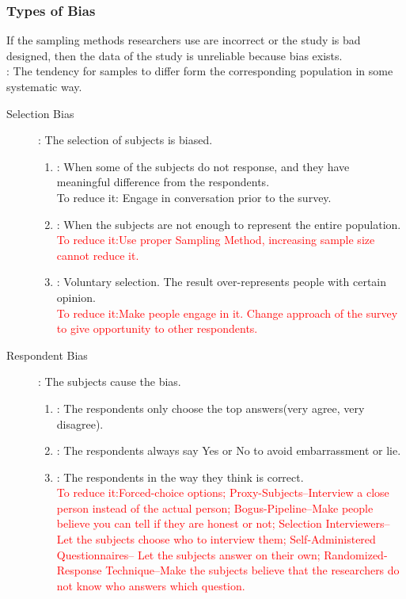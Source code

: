  
 \subsubsection{Types of Bias}
 If the sampling methods researchers use are incorrect or the study is bad designed, then the data of the study is unreliable because bias exists.\\
 
 
: The tendency for samples to differ form the corresponding population in some systematic way.
    \begin{description}
       \item[Selection Bias]: The selection of subjects is biased. 
       \begin{enumerate}
           \item {}: When some of the subjects do not response, and they have meaningful difference from the respondents.\\To reduce it: Engage in conversation prior to the survey.
            \item {} : When the subjects are not enough to represent the entire population.\\ \textcolor{red}{To reduce it:Use proper Sampling Method, increasing sample size cannot reduce it.}
            \item {} : Voluntary selection. The result over-represents people with certain opinion.\\ \textcolor{red}{To reduce it:Make people engage in it. Change approach of the survey to give opportunity to other respondents.}
       \end{enumerate}
            
      
       \item[Respondent Bias]: The subjects cause the bias.
       
       \begin{enumerate}
      
           \item {} : The respondents only choose the top answers(very agree, very disagree).
           \item {} : The respondents always say Yes or No to avoid embarrassment or lie.
           \item {} : The respondents in the way they think is correct.\\\textcolor{red}{To reduce it:Forced-choice options; Proxy-Subjects--Interview a close person instead of the actual person; Bogus-Pipeline--Make people believe you can tell if they are honest or not; Selection Interviewers-- Let the subjects choose who to interview them; Self-Administered Questionnaires-- Let the subjects answer on their own; Randomized-Response Technique--Make the subjects believe that the researchers do not know who answers which question.}
       \end{enumerate}
       

\end{description}
